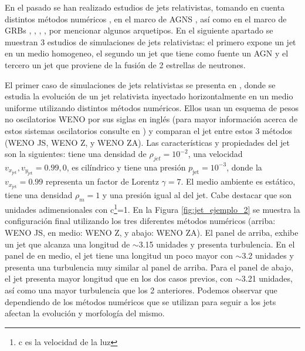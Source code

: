 \documentclass[12pt,a4paper]{book}
\begin{document}
En el pasado se han realizado estudios de jets relativistas, tomando en cuenta distintos métodos numéricos \citep{Seo2021, MB-HLLC-I}, en el marco de AGNS \citep{2011ApJ...743...42P}, así como en el marco de GRBs 
\citep{2013ApJ...767...19L}, \citep{2018PhRvL.120x1103L}, \citep{2021MNRAS.500.3511G}, \citep{2012ApJ...751...57D}, por mencionar algunos arquetipos. En el siguiente apartado se muestran 3 estudios de simulaciones
de jets relativistas: el primero expone un jet en un medio homogeneo, el segundo un jet que tiene como fuente un AGN y el tercero un jet que proviene de la fusión de 2 estrellas de neutrones.

El primer caso de simulaciones de jets relativistas se presenta en 
\citet{Seo2021}, donde se estudia la evolución de un jet relativista inyectado horizontalmente en un medio uniforme utilizando distintos métodos numéricos. Ellos usan un esquema de pesos no oscilatorios WENO por
sus siglas en inglés (para mayor información acerca de estos sistemas oscilatorios consulte en \citet{Seo2021}) y comparan el jet entre estos 3 métodos (WENO JS, WENO Z, y WENO ZA).
Las características y propiedades del jet son la siguientes: tiene una 
densidad de $\rho_{jet} = 10^{-2}$, una velocidad $v_{x_{\text{jet}}},v_{y_{\text{jet}}} = 0.99, 0$, es cilíndrico y 
tiene una presión $p_{\text{jet}} = 10^{-3}$, donde la $v_{x_{\text{jet}}} = 0.99$ representa un factor de Lorentz $\gamma = 7$. El medio ambiente es estático, tiene una densidad $\rho_m = 1$ y una presión igual al del jet.
Cabe destacar que son unidades adimensionales con c\footnote{c es la velocidad de la luz}=1.
En la Figura \ref{fig:jet_ejemplo_2} se muestra la configuración final utilizando los tres diferentes métodos numéricos (arriba: WENO JS, en medio: WENO Z, y abajo: WENO ZA). El panel de arriba, exhibe un 
jet que alcanza una longitud de $\sim$3.15 unidades y presenta turbulencia. En el panel de en medio, el jet tiene una longitud un poco mayor con $\sim$3.2 unidades y presenta una turbulencia muy similar al panel de arriba. 
Para el panel de abajo, el jet presenta mayor longitud que en los dos casos previos, con $\sim$3.21 unidades, así como una mayor turbulencia que los 2 anteriores. Podemos observar que dependiendo de
los métodos numéricos que se utilizan para seguir a los jets afectan la evolución y morfología del mismo.
\end{document}
